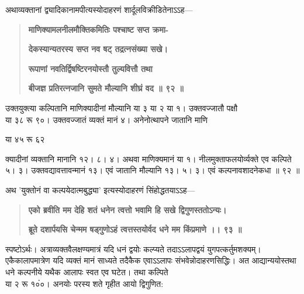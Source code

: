 \documentclass[11pt, openany]{book}
\begin{document}
\begin{sloppypar}
\hangindent=0.2in \hspace{0.2in}अथाव्यक्तानां द्व्यादिकानामपीत्यस्योदाहरणं शार्दूलविक्रीडितेनाऽऽह---

\begin{quote}
\hspace{1in}\textbf{माणिक्यामलनीलमौक्तिकमितिः पश्चाष्ट सप्त क्रमा-}

\hspace{1in}\textbf{देकस्यान्यतरस्य सप्त नव षट् तद्रत्नसंख्या सखे।}

\hspace{1in}\textbf{रूपाणां नवतिर्द्विषष्टिरनयोस्तौ तुल्यवित्तौ तथा}

\hspace{1in}\textbf{बीजज्ञ प्रतिरत्नजानि सुमते मौल्यानि शीघ्रं वद ॥ ९२ ॥}
\end{quote}

\hangindent=0.2in \hspace{0.2in}उक्तयुक्त्या कल्पितानि माणिक्यादीनां मौल्यानि या ३ या २ या १। उक्तवज्जातौ पक्षौ\\ या ३८ रू ९०। उक्तवज्जातं व्यक्तं मानं ४। अनेनोत्थापने जातानि माणि

या ४५ रू ६२

\hangindent=0.2in क्यादीनां व्यक्तानि मानानि १२। ८। ४। अथवा माणिक्यमानं या १। नीलमुक्ताफलयोर्व्यक्ते एव कल्पिते ५। ३। उक्तवद्यावत्तावन्मानं १३। एवं जातानि मौल्यानि १३। ५। ३। एवं कल्पनावशादनेकधा ॥ ९२ ॥

\hangindent=0.2in \hspace{0.2in}अथ 'युक्तोनं वा कल्पयेदात्मबुद्ध्या' इत्यस्योदाहरणं सिंहोद्धतयाऽऽह---

\begin{quote}
\hspace{0.5in}\textbf{एको ब्रवीति मम देहि शतं धनेन त्वत्तो भवामि हि सखे द्विगुणस्ततोऽन्यः।}

\hspace{0.5in}\textbf{ब्रूते दशार्पयसि चेन्मम षड्गुणोऽहं त्वत्तस्तयोर्वद धने मम किंप्रमाणे ।। ९३ ॥}
\end{quote}

\hangindent=0.2in \hspace{0.2in}स्पष्टोऽर्थः। अत्राव्यक्तवैलक्षण्यमात्रं यदि धनं द्वयोः कल्प्यते तदाऽऽलापद्वयं युगपत्कर्तुमशक्यम्। एकैकालापमात्रेण यदि व्यक्तं मानं साध्यते तदैकैक एवाऽऽलापः संभवेन्नोदाहरणसिद्धिः। अत आद्यान्ययोस्तथा धने कल्पनीये यथैक आलापः स्वत एव घटेत। तथा कल्पिते\\या २ रू १०ं०। अनयोः परस्य शते गृहीत आयो द्विगुणित:


\end{sloppypar}
\end{document}
